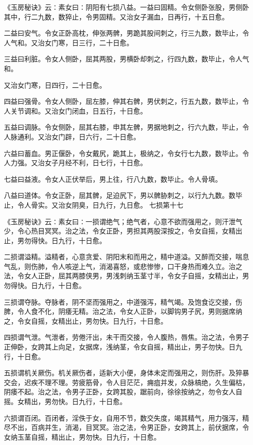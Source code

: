 \documentclass[a4paper,12pt,UTF8,twoside]{ctexbook}
\begin{document}
《玉房秘诀》云∶素女曰∶阴阳有七损八益。一益曰固精。令女侧卧张股，男侧卧其中，行二九数，数猝止，令男固精。又治女子漏血，日再行，十五日愈。

二益曰安气。令女正卧高枕，伸张两髀，男跪其股间刺之，行三九数，数毕止，令人气和。又治女门寒，日三行，二十日愈。

三益曰利脏。令女人侧卧，屈其两股，男横卧却刺之，行四九数，数毕止，令人气和。

又治女门寒，日四行，二十日愈。

四益曰强骨。令女人侧卧，屈左膝，伸其右髀，男伏刺之，行五九数，数毕止，令人关节调和。又治女门闭血，日五行，十日愈。

五益曰调脉。令女侧卧，屈其右膝，申其左髀，男据地刺之，行六九数，毕止，令人脉通利。又治女门辟，日六行，二十日愈。

六益曰蓄血。男正偃卧，令女戴尻，跪其上，极纳之，令女行七九数，数毕止。令人力强。又治女子月经不利，日七行，十日愈。

七益曰益液。令女人正伏举后，男上往，行八九数，数毕止。令人骨填。

八益曰道体。令女正卧，屈其髀，足迫尻下，男以髀胁刺之，以行九九数。数毕止，令人骨实。又治女阴臭，日九行，九日愈。
七损第十七

《玉房秘诀》云∶素女曰∶一损谓绝气；绝气者，心意不欲而强用之，则汗泄气少，令心热目冥冥。治之法，令女正卧，男担其两股深按之，令女自摇，女精出止，男勿得快。日九行，十日愈。

二损谓溢精。溢精者，心意贪爱、阴阳末和而用之，精中道溢。又醉而交接，喘息气乱，则伤肺，令人咳逆上气，消渴喜怒，或悲惨惨，口干身热而难久立。治之法，令女人正卧，屈其两膝侠男，男浅刺纳玉茎寸半，令女子自摇，女精出止，男勿得快。日九行，十日愈。

三损谓夺脉。夺脉者，阴不坚而强用之，中道强泻，精气竭。及饱食讫交接，伤脾，令人食不化，阴痿无精。治之法，令女人正卧，以脚钩男子尻，男则据席纳之，令女自摇，女精出止，男勿快。日九行，十日愈。

四损谓气泄。气泄者，劳倦汗出，未干而交接，令人腹热，唇焦。治之法，令男子正伸卧，女跨其上向足，女据席，浅纳茎，令女自摇，精出止，男子勿快。日九行，十日愈。

五损谓机关厥伤。机关厥伤者，适新大小便，身体未定而强用之，则伤肝。及猝暴交会，迟疾不理不理。劳疲筋骨，令人目茫茫，痈疽并发，众脉槁绝，久生偏枯，阴痿不起。治之法，令男子正卧，女跨其股，踞前向，徐徐按纳之，勿令女人自摇。女精出，男勿快。日九行，十日愈。

六损谓百闭。百闭者，淫佚于女，自用不节，数交失度，竭其精气，用力强泻，精尽不出，百病并生，消渴，目冥冥。治之法，令男正卧，女跨其上，前伏据席，令女纳玉茎自摇，精出止，男勿快。日九行，十日愈。
\end{document}
